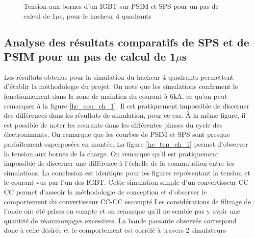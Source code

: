 \begin{figure}[htb]
\caption{Tension aux bornes d'un IGBT sur PSIM et SPS pour un pas de calcul de 1$\mu$s, pour le hacheur 4 quadrants}
\label{hc_IG_ten_1}
\end{figure}


\clearpage
\subsection{Analyse des résultats comparatifs de SPS et de PSIM pour un pas de calcul de 1$\mu$s}

Les résultats obtenus pour la simulation du hacheur 4 quadrants permettent d'établir la méthodologie du projet. On note que les simulations confirment le fonctionnement dans la zone de maintien du courant à 6kA, ce qu'on peut remarquer à la figure \ref{hc_cou_ch_1}. Il est pratiquement impossible de discerner des différences dans les résultats de simulation, pour ce cas. À la même figure, il est possible de noter les courants dans les différentes phases du cycle des électroaimants. On remarque que les courbes de PSIM et SPS sont presque parfaitement superposées en montée. La figure \ref{hc_ten_ch_1} permet d'observer la tension aux bornes de la charge. On remarque qu'il est pratiquement impossible de discerner une différence à l'échelle de la commutation entre les simulations. La conclusion est identique pour les figures représentant la tension et le courant vus par l'un des IGBT. Cette simulation simple d'un convertisseur CC-CC permet d'asseoir la méthodologie de conception et d'observer le comportement du convertisseur CC-CC escompté Les considérations de filtrage de l'onde ont été prises en compte et on remarque qu'il ne semble pas y avoir une quantité de réammorçages excessives. La bande passante observée correspond donc à celle désirée et le comportement est corrélé à travers 2 simulateurs




